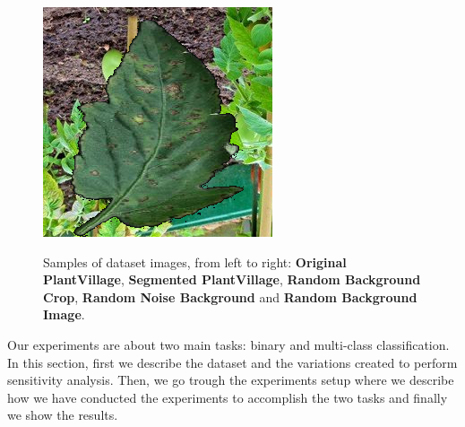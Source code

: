 \begin{figure}
\begin{center}
{			\includegraphics[scale=0.2241]{./images/random_backgorund}
		}
		\begin{center}
			\caption{Samples of dataset images, from left to right: \textbf{Original PlantVillage}, \textbf{Segmented PlantVillage}, \textbf{Random Background Crop}, \textbf{Random Noise Background} and \textbf{Random Background Image}.}
			\label{fig:samples}
		\end{center}
		\vspace{-32pt}
	\end{center}
\end{figure}
Our experiments are about two main tasks: binary and multi-class classification. In this section, first we describe the dataset and the variations created to perform sensitivity analysis. Then, we go trough the experiments setup where we describe how we have conducted the experiments to accomplish the two tasks and finally we show the results.
